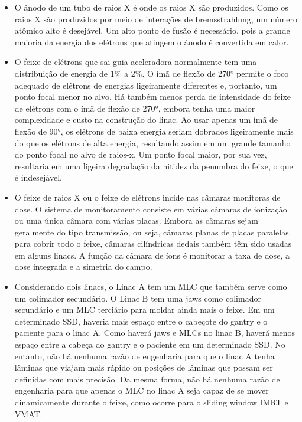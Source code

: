 \documentclass[11pt,a4paper]{article}
\newcounter{exemplo}
\begin{document}
\begin{exemplo}[Física]
\begin{itemize}
        \item O ânodo de um tubo de raios X é onde os raios X são produzidos. Como os raios X são produzidos por meio de interações de bremsstrahlung, um número atômico alto é desejável. Um alto ponto de fusão é necessário, pois a grande maioria da energia dos elétrons que atingem o ânodo é convertida em calor. 
        
        \item O feixe de elétrons que sai guia aceleradora normalmente tem uma distribuição de energia de 1\% a 2\%. O ímã de flexão de \ang{270} permite o foco adequado de elétrons de energias ligeiramente diferentes e, portanto, um  ponto focal menor no alvo. Há também menos perda de intensidade do feixe de elétrons com o ímã de flexão de \ang{270}, embora tenha uma maior complexidade e custo na construção do linac. Ao usar apenas um ímã de flexão de \ang{90}, os elétrons de baixa energia seriam dobrados ligeiramente mais do que os elétrons de alta energia, resultando assim em um grande tamanho do ponto focal no alvo de raios-x. Um ponto focal maior, por sua vez, resultaria em uma ligeira degradação da nitidez da penumbra do feixe, o que é indesejável.
        
        \item O feixe de raios X ou o feixe de elétrons incide nas câmaras monitoras de dose. O sistema de monitoramento consiste em várias câmaras de ionização ou uma única câmara com várias placas. Embora as câmaras sejam geralmente do tipo transmissão, ou seja, câmaras planas de placas paralelas para cobrir todo o feixe, câmaras cilíndricas dedais também têm sido usadas em alguns linacs. A função da câmara de íons é monitorar a taxa de dose, a dose integrada e a simetria do campo.
        
        \item Considerando dois linacs, o Linac A tem um MLC que também serve como um colimador secundário. O Linac B tem uma jaws como colimador secundário e um MLC terciário para moldar ainda mais o feixe. Em um determinado SSD, haveria mais espaço entre o cabeçote do gantry e o paciente para o linac A. Como haverá jaws e MLCs no linac B, haverá menos espaço entre a cabeça do gantry e o paciente em um determinado SSD. No entanto, não há nenhuma razão de engenharia para que o linac A tenha lâminas que viajam mais rápido ou posições de lâminas que possam ser definidas com mais precisão. Da mesma forma, não há nenhuma razão de engenharia para que apenas o MLC no linac A seja capaz de se mover dinamicamente durante o feixe, como ocorre para o sliding window IMRT e VMAT. 
        

\end{itemize}
\end{exemplo}
\end{document}
